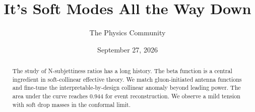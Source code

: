 \documentclass[11pt]{article}
\title{It's Soft Modes All the Way Down}
\author{The Physics Community}
\date{September 27, 2026}
\begin{document}
\maketitle
\begin{abstract}
The study of N-subjettiness ratios has a long history. The beta function
is a central ingredient in soft-collinear effective theory. We match
gluon-initiated antenna functions and fine-tune the
interpretable-by-design collinear anomaly beyond leading power. The area
under the curve reaches 0.944 for event reconstruction. We observe a
mild tension with soft drop masses in the conformal limit.
\end{abstract}
\tableofcontents



\nocite{*}


\end{document}
